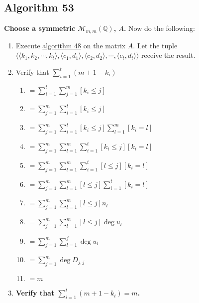 \documentclass[twocolumn]{article}
\begin{document}
		\subsection{Algorithm 53}\label{sec:algorithm 53}
			\textbf{Choose a symmetric $\mathcal{M}_{m,m}(\mathbb{Q})$, $A$.} Now do the following:
			\begin{enumerate}
				\item Execute \hyperref[sec:algorithm 48]{algorithm 48} on the matrix $A$. Let the tuple $\langle\langle k_1,k_2,\cdots,k_t\rangle,\langle c_1,d_1\rangle,\langle c_2,d_2\rangle,\cdots,\langle c_t,d_t\rangle\rangle$ receive the result.
				\item Verify that $\sum_{i=1}^t(m+1-k_i)$
				\begin{enumerate}
					\item $=\sum_{i=1}^t\sum_{j=1}^m [k_i\le j]$
					\item $=\sum_{j=1}^m\sum_{i=1}^t [k_i\le j]$
					\item $=\sum_{j=1}^m\sum_{i=1}^t [k_i\le j]\sum_{l=1}^m [k_i=l]$
					\item $=\sum_{j=1}^m\sum_{l=1}^m\sum_{i=1}^t [k_i\le j][k_i=l]$
					\item $=\sum_{j=1}^m\sum_{l=1}^m\sum_{i=1}^t [l\le j][k_i=l]$
					\item $=\sum_{j=1}^m\sum_{l=1}^m [l\le j]\sum_{i=1}^t [k_i=l]$
					\item $=\sum_{j=1}^m\sum_{l=1}^m [l\le j]n_l$
					\item $=\sum_{j=1}^m\sum_{l=1}^m [l\le j]\deg u_l$
					\item $=\sum_{j=1}^m\sum_{l=1}^j \deg u_l$
					\item $=\sum_{j=1}^m \deg D_{j,j}$
					\item $=m$
				\end{enumerate}
				\item \textbf{Verify that $\sum_{i=1}^t(m+1-k_i)=m$.}
			\end{enumerate}
\end{document}
